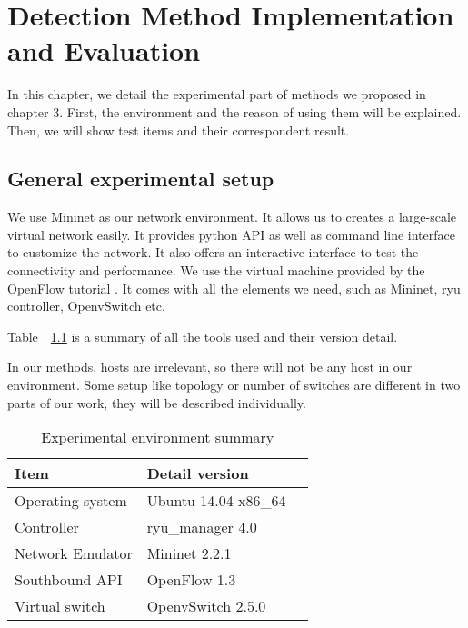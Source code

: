 \chapter{Detection Method Implementation and Evaluation}
In this chapter, we detail the experimental part of methods we proposed in chapter 3. First, the environment and the reason of using them will be explained. Then, we will show test items and their correspondent result.

\section{General experimental setup}
We use Mininet as our network environment. It allows us to creates a large-scale virtual network easily. 
It provides python API as well as command line interface to customize the network. It also offers an interactive interface to test the connectivity and performance. We use the virtual machine provided by the OpenFlow tutorial \cite{OFT}. It comes with all the elements we need, such as Mininet, ryu controller, OpenvSwitch etc.

Table~~\ref{table:Experiment_table} is a summary of all the tools used and their version detail. 

In our methods, hosts are irrelevant, so there will not be any host in our environment. Some setup like topology or number of switches are different in two parts of our work, they will be described individually.

\begin{table}[H]
\centering
\caption{Experimental environment summary}
\begin{tabular}{|l|p{4cm}|p{4.5cm}}
\hline Item & Detail version \\
\hline Operating system & Ubuntu 14.04 x86\_64 \\
\hline Controller & ryu\_manager 4.0 \\
\hline Network Emulator & Mininet 2.2.1\\
\hline Southbound API & OpenFlow 1.3 \\
\hline Virtual switch & OpenvSwitch 2.5.0 \\
\hline 
\end{tabular}
\label{table:Experiment_table}
\end{table}

